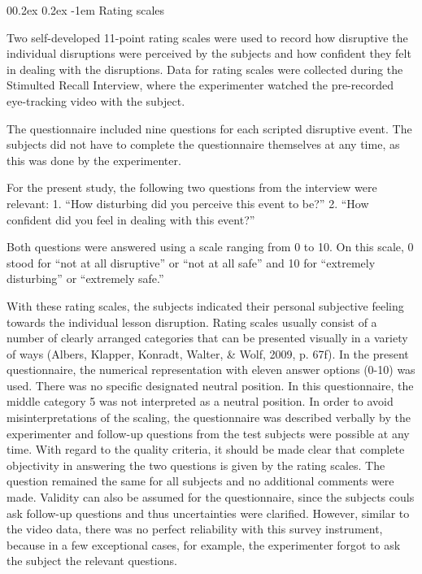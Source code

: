 \documentclass[
  man]{apa6}
\makeatletter
\let\oldparagraph\paragraph
\renewcommand{\paragraph}[1]{\oldparagraph{#1}\mbox{}}
\renewcommand{\paragraph}{\@startsection{paragraph}{4}{\parindent}%
  {0\baselineskip \@plus 0.2ex \@minus 0.2ex}%
  {-1em}%
  {\normalfont\normalsize\bfseries\itshape\typesectitle}}
\makeatother
\begin{document}
\hypertarget{rating-scales}{%
\paragraph{Rating scales}\label{rating-scales}}

Two self-developed 11-point rating scales were used to record how disruptive the individual disruptions were perceived by the subjects and how confident they felt in dealing with the disruptions. Data for rating scales were collected during the Stimulted Recall Interview, where the experimenter watched the pre-recorded eye-tracking video with the subject.

The questionnaire included nine questions for each scripted disruptive event. The subjects did not have to complete the questionnaire themselves at any time, as this was done by the experimenter.

For the present study, the following two questions from the interview were relevant:
1. ``How disturbing did you perceive this event to be?''
2. ``How confident did you feel in dealing with this event?''

Both questions were answered using a scale ranging from 0 to 10. On this scale, 0 stood for ``not at all disruptive'' or ``not at all safe'' and 10 for ``extremely disturbing'' or ``extremely safe.''

With these rating scales, the subjects indicated their personal subjective feeling towards the individual lesson disruption. Rating scales usually consist of a number of clearly arranged categories that can be presented visually in a variety of ways (Albers, Klapper, Konradt, Walter, \& Wolf, 2009, p. 67f). In the present questionnaire, the numerical representation with eleven answer options (0-10) was used. There was no specific designated neutral position. In this questionnaire, the middle category 5 was not interpreted as a neutral position. In order to avoid misinterpretations of the scaling, the questionnaire was described verbally by the experimenter and follow-up questions from the test subjects were possible at any time. With regard to the quality criteria, it should be made clear that complete objectivity in answering the two questions is given by the rating scales. The question remained the same for all subjects and no additional comments were made. Validity can also be assumed for the questionnaire, since the subjects couls ask follow-up questions and thus uncertainties were clarified. However, similar to the video data, there was no perfect reliability with this survey instrument, because in a few exceptional cases, for example, the experimenter forgot to ask the subject the relevant questions.
\end{document}

